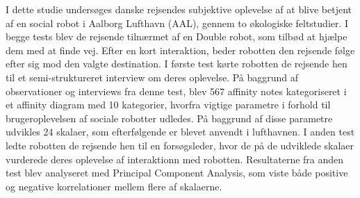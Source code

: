 I dette studie undersøges danske rejsendes subjektive oplevelse af at blive betjent af en social robot i Aalborg Lufthavn (AAL), gennem to økologiske feltstudier. I begge tests blev de rejsende tilnærmet af en Double robot, som tilbød at hjælpe dem med at finde vej. Efter en kort interaktion, beder robotten den rejsende følge efter sig mod den valgte destination. I første test kørte robotten de rejsende hen til et semi-struktureret interview om deres oplevelse. På baggrund af observationer og interviews fra denne test, blev 567 affinity notes kategoriseret i et affinity diagram med 10 kategorier, hvorfra vigtige parametre i forhold til brugeroplevelsen af sociale robotter udledes. På baggrund af disse parametre udvikles 24 skalaer, som efterfølgende er blevet anvendt i lufthavnen. I anden test ledte robotten de rejsende hen til en forsøgsleder, hvor de på de udviklede skalaer vurderede deres oplevelse af interaktionn med robotten. Resultaterne fra anden test blev analyseret med Principal Component Analysis, som viste både positive og negative korrelationer mellem flere af skalaerne.